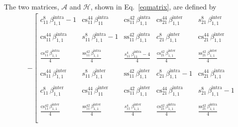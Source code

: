 \documentclass[aps,prb,onecolumn,nofootinbib,citeautoscript,10pt]{revtex4-2}
\begin{document}
The two matrices, $\mathcal A$ and $\mathcal H$, shown in Eq.~\eqref{eqmatrix}, are defined by
{\tiny
\begin{align*}
& - \left[ 
\begin{matrix}
c_{11}^8 \, \beta_{1,1}^{\text{intra}} -1
& \text{cs}_{11}^{44} \, \beta_{11}^{\text{intra}}
& \text{cs}_{11}^{42} \, \beta_{1,1}^{\text{intra}} 
 & \text{cs}_{21}^{44} \, \beta_{1,1}^{\text{inter}} 
   & s_{21}^8 \, \beta_{1,1}^{\text{inter}} \\ \\
 \text{cs}_{11}^{44} \, \beta_{1,1}^{\text{intra}} 
 & s_{11}^8 \, \beta_{1,1}^{\text{intra}} -1
 & \text{ss}_{11}^{42} \, \beta_{1,1}^{\text{intra}} 
 & c_{21}^8 \, \beta_{1,1}^{\text{inter}} 
   & \text{cs}_{21}^{44} \, \beta_{1,1}^{\text{inter}} \\ \\
\frac{ \text{cs}_{11}^{42} \, \beta_{1,1}^{\text{intra}} }{4} 
 & \frac{  \text{ss}_{11}^{42} \, \beta_{1,1}^{\text{intra}} }{4} 
  &\frac{  s_{11}^4 \, \beta_{11}^{\text{intra}}- 4}   {4} 
   & \frac{  \text{cs}_{21}^{42} \, \beta_{1,1}^{\text{inter}} }{4} 
   & \frac{  \text{ss}_{21}^{42} \, \beta_{1,1}^{\text{inter}} }{4} \\ \\
\text{cs}_{11}^{44} \, \beta_{1,1}^{\text{inter}} 
& s_{11}^8 \, \beta_{1,1}^{\text{inter}} 
 & \text{ss}_{11}^{42} \, \beta_{1,1}^{\text{inter}} 
 &  c_{21}^8 \, \beta_{1,1}^{\text{intra}} -1
   & \text{cs}_{21}^{44} \, \beta_{1,1}^{\text{intra}} \\ \\
 c_{11}^8 \, \beta_{1,1}^{\text{inter}} 
 & \text{cs}_{11}^{44} \, \beta_{11}^{\text{inter}}
  & \text{cs}_{11}^{42} \, \beta_{1,1}^{\text{inter}} 
 & \text{cs}_{21}^{44} \, \beta_{1,1}^{\text{intra}} 
& s_{21}^8 \, \beta_{1,1}^{\text{intra}} - 1 \\ \\
 \frac{  \text{cs}_{11}^{42} \, \beta_{1,1}^{\text{inter}} }{4} 
 & \frac{  \text{ss}_{11}^{42} \, \beta_{1,1}^{\text{inter}} }{4} 
 & \frac{  s_{11}^4 \, \beta_{1,1}^{\text{inter}} }{4} 
 & \frac{  \text{cs}_{21}^{42} \, \beta_{1,1}^{\text{intra}} }{4} 
 & \frac{ \text{ss}_{21}^{42} \, \beta_{1,1}^{\text{intra}} }{4}  \\ \\

\end{matrix}
\end{align*}}
\end{document}
